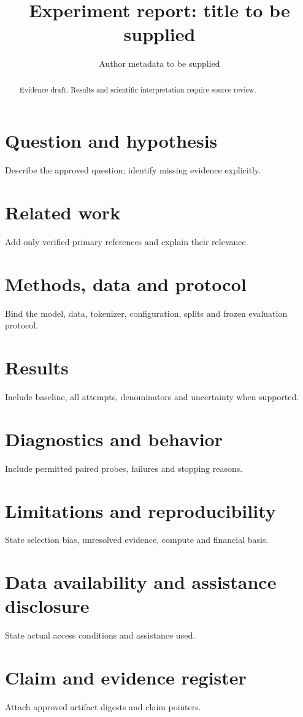 \documentclass[11pt]{article}
\title{Experiment report: title to be supplied}
\author{Author metadata to be supplied}
\date{}
\begin{document}
\maketitle
\begin{abstract}Evidence draft. Results and scientific interpretation require source review.\end{abstract}
\section{Question and hypothesis}
Describe the approved question; identify missing evidence explicitly.
\section{Related work}
Add only verified primary references and explain their relevance.
\section{Methods, data and protocol}
Bind the model, data, tokenizer, configuration, splits and frozen evaluation protocol.
\section{Results}
Include baseline, all attempts, denominators and uncertainty when supported.
\section{Diagnostics and behavior}
Include permitted paired probes, failures and stopping reasons.
\section{Limitations and reproducibility}
State selection bias, unresolved evidence, compute and financial basis.
\section{Data availability and assistance disclosure}
State actual access conditions and assistance used.
\appendix
\section{Claim and evidence register}
Attach approved artifact digests and claim pointers.
\end{document}
